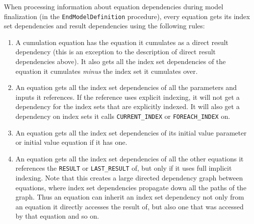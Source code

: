 \documentclass[11pt]{article}
\theoremstyle{definition}
\begin{document}
When processing information about equation dependencies during model finalization (in the {\tt EndModelDefinition} procedure), every equation gets its index set dependencies and result dependencies using the following rules:
\begin{enumerate}[i]
\item A cumulation equation has the equation it cumulates as a direct result dependency (this is an exception to the description of direct result dependencies above). It also gets all the index set dependencies of the equation it cumulates \emph{minus} the index set it cumulates over.
\item An equation gets all the index set dependencies of all the parameters and inputs it references. If the reference uses explicit indexing, it will not get a dependency for the index sets that are explicitly indexed. It will also get a dependency on index sets it calls {\tt CURRENT\_INDEX} or {\tt FOREACH\_INDEX} on.
\item An equation gets all the index set dependencies of its initial value parameter or initial value equation if it has one.
\item An equation gets all the index set dependencies of all the other equations it references the {\tt RESULT} or {\tt LAST\_RESULT} of, but only if it uses full implicit indexing. Note that this creates a large directed dependency graph between equations, where index set dependencies propagate down all the paths of the graph. Thus an equation can inherit an index set dependency not only from an equation it directly accesses the result of, but also one that was accessed by that equation and so on.
\end{enumerate}
\end{document}
